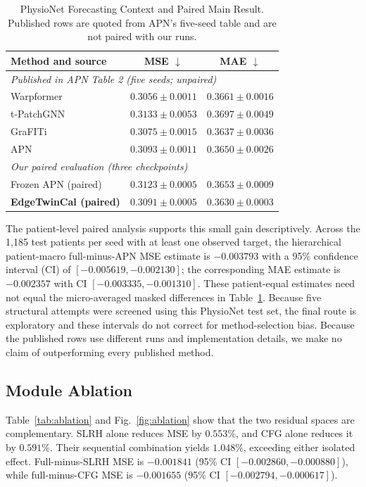 \documentclass[conference]{IEEEtran}
\begin{document}
\begin{table}[t]
\caption{PhysioNet Forecasting Context and Paired Main Result. Published rows are quoted from APN's five-seed table and are not paired with our runs.}
\label{tab:main}
\centering
\scriptsize
\setlength{\tabcolsep}{2.2pt}
\begin{tabular}{lcc}
\toprule
Method and source & MSE $\downarrow$ & MAE $\downarrow$ \\
\midrule
\multicolumn{3}{l}{\emph{Published in APN Table 2 (five seeds; unpaired)}} \\
Warpformer & $0.3056{\pm}0.0011$ & $0.3661{\pm}0.0016$ \\
t-PatchGNN & $0.3133{\pm}0.0053$ & $0.3697{\pm}0.0049$ \\
GraFITi & $0.3075{\pm}0.0015$ & $0.3637{\pm}0.0036$ \\
APN & $0.3093{\pm}0.0011$ & $0.3650{\pm}0.0026$ \\
\midrule
\multicolumn{3}{l}{\emph{Our paired evaluation (three checkpoints)}} \\
Frozen APN (paired) & $0.3123{\pm}0.0005$ & $0.3653{\pm}0.0009$ \\
\textbf{EdgeTwinCal (paired)} & $\mathbf{0.3091{\pm}0.0005}$ & $\mathbf{0.3630{\pm}0.0003}$ \\
\bottomrule
\end{tabular}
\end{table}

The patient-level paired analysis supports this small gain descriptively. Across the 1,185 test patients per seed with at least one observed target, the hierarchical patient-macro full-minus-APN MSE estimate is $-0.003793$ with a 95\% confidence interval (CI) of $[-0.005619,-0.002130]$; the corresponding MAE estimate is $-0.002357$ with CI $[-0.003335,-0.001310]$. These patient-equal estimates need not equal the micro-averaged masked differences in Table~\ref{tab:main}. Because five structural attempts were screened using this PhysioNet test set, the final route is exploratory and these intervals do not correct for method-selection bias. Because the published rows use different runs and implementation details, we make no claim of outperforming every published method.

\subsection{Module Ablation}
Table~\ref{tab:ablation} and Fig.~\ref{fig:ablation} show that the two residual spaces are complementary. SLRH alone reduces MSE by $0.553\%$, and CFG alone reduces it by $0.591\%$. Their sequential combination yields $1.048\%$, exceeding either isolated effect. Full-minus-SLRH MSE is $-0.001841$ (95\% CI $[-0.002860,-0.000880]$), while full-minus-CFG MSE is $-0.001655$ (95\% CI $[-0.002794,-0.000617]$).
\end{document}
